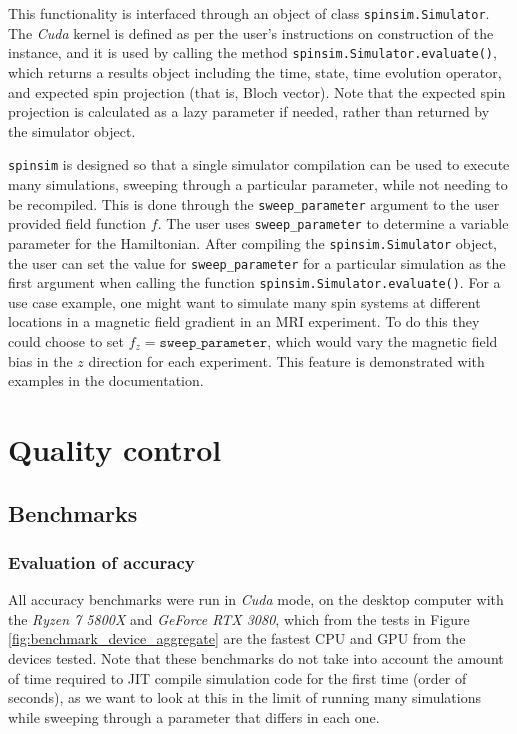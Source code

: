 \documentclass{jors}
\begin{document}
			This functionality is interfaced through an object of class \texttt{spinsim.Simulator}. The \emph{Cuda} kernel is defined as per the user’s instructions on construction of the instance, and it is used by calling the method \texttt{spinsim.Simulator.evaluate()}, which returns a results object including the time, state, time evolution operator, and expected spin projection (that is, Bloch vector). Note that the expected spin projection is calculated as a lazy parameter if needed, rather than returned by the simulator object.

			\texttt{spinsim} is designed so that a single simulator compilation can be used to execute many simulations, sweeping through a particular parameter, while not needing to be recompiled. This is done through the \texttt{sweep\_parameter} argument to the user provided field function \(f\). The user uses \texttt{sweep\_parameter} to determine a variable parameter for the Hamiltonian. After compiling the \texttt{spinsim.Simulator} object, the user can set the value for \texttt{sweep\_parameter} for a particular simulation as the first argument when calling the function \texttt{spinsim.Simulator.evaluate()}. For a use case example, one might want to simulate many spin systems at different locations in a magnetic field gradient in an MRI experiment. To do this they could choose to set \(f_z =\texttt{sweep\_parameter}\), which would vary the magnetic field bias in the \(z\) direction for each experiment. This feature is demonstrated with examples in the documentation.

\section{Quality control}
	\subsection{Benchmarks}
		\subsubsection{Evaluation of accuracy}
		All accuracy benchmarks were run in \emph{Cuda} mode, on the desktop computer with the \emph{Ryzen 7 5800X} and \emph{GeForce RTX 3080}, which from the tests in Figure \ref{fig:benchmark_device_aggregate} are the fastest CPU and GPU from the devices tested. Note that these benchmarks do not take into account the amount of time required to JIT compile simulation code for the first time (order of seconds), as we want to look at this in the limit of running many simulations while sweeping through a parameter that differs in each one.
		
\end{document}
